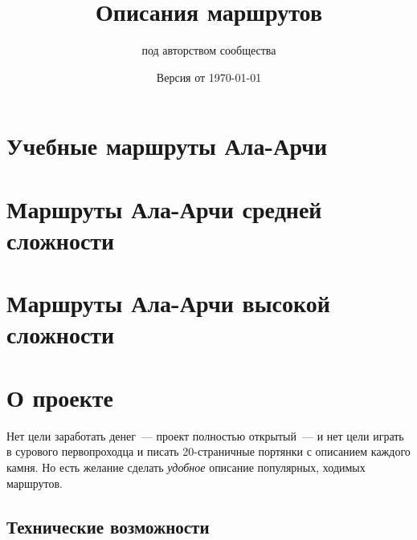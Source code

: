 \documentclass[11pt,fleqn]{report} %
\title{Описания маршрутов}
\date{Версия от \today}
\author{под авторством сообщества}
\begin{document}
\maketitle

\tableofcontents

\chapter{Учебные маршруты Ала-Арчи}

\routeListEasyAlaArcha

\chapter{Маршруты Ала-Арчи средней сложности}

\routeListMiddleAlaArcha

\chapter{Маршруты Ала-Арчи высокой сложности}

\routeListHighAlaArcha



\chapter{О проекте}

\newcommand{\gitRepo}[0]{\href{https://github.com/johnlepikhin/alpine-guidebook}{GitHub}}

Нет цели заработать денег~--- проект полностью открытый~--- и нет цели играть в сурового первопроходца и писать 20-страничные портянки с
описанием каждого камня. Но есть желание сделать \textit{удобное} описание популярных, ходимых маршрутов.

\section{Технические возможности}
\end{document}
